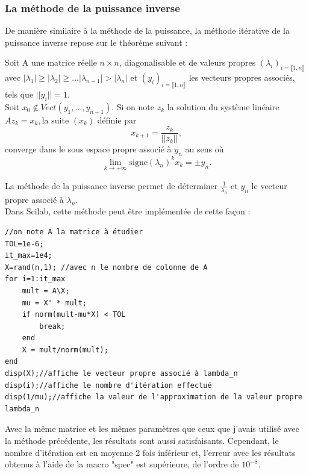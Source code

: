       \subsubsection{La méthode de la puissance inverse}
      De manière similaire à la méthode de la puissance, la méthode itérative de la puissance inverse repose sur le théorème suivant : 
      \begin{theoreme}
      Soit A une matrice réelle $n\times n$, diagonalisable et de valeurs propres $(\lambda_i)_{i=\llbracket1,n\rrbracket}$ avec $|\lambda_1|\geq|\lambda_2|\geq...|\lambda_{n-1}|>|\lambda_n|$ et $(y_i)_{i=\llbracket1,n\rrbracket}$ les vecteurs propres associés, tels que $||y_i||=1$.\\
      Soit $x_0\notin Vect(y_1,...,y_{n-1}).$ Si on note $z_k$ la solution du système linéaire $Az_k=x_k,$la suite $(x_k)$ définie par 
      $$x_{k+1}=\frac{z_k}{||z_k||},$$
      converge dans le sous espace propre associé à $y_n$ au sens où
      $$\lim\limits_{k\to +\infty}\text{signe}(\lambda_n)^kx_k=\pm y_n.$$
      \end{theoreme}
      La méthode de la puissance inverse permet de déterminer $\frac{1}{\lambda_n}$ et $y_n$ le vecteur propre associé à $\lambda_n$.\\
      Dans Scilab, cette méthode peut être implémentée de cette façon : 
      \begin{center}
          \begin{verbatim}
//on note A la matrice à étudier
TOL=1e-6;
it_max=1e4;
X=rand(n,1); //avec n le nombre de colonne de A
for i=1:it_max
    mult = A\X;
    mu = X' * mult;
    if norm(mult-mu*X) < TOL
        break;
    end
    X = mult/norm(mult);
end
disp(X);//affiche le vecteur propre associé à lambda_n
disp(i);//affiche le nombre d'itération effectué
disp(1/mu);//affiche la valeur de l'approximation de la valeur propre lambda_n
          \end{verbatim}
                \label{lst:code_19}
         \end{center}
         Avec la même matrice et les mêmes paramètres que ceux que j'avais utilisé avec la méthode précédente, les résultats sont aussi satisfaisants. Cependant, le nombre d'itération est en moyenne 2 fois inférieur et, l'erreur avec les résultats obtenus à l'aide de la macro "spec" est supérieure, de l'ordre de $10^{-8}$.
         \newpage
